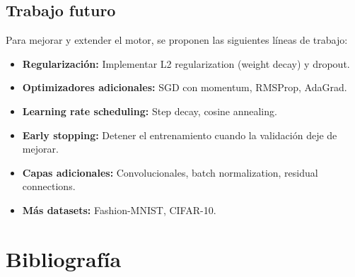 \documentclass[a4paper,11pt]{article}
\begin{document}
\subsection{Trabajo futuro}

Para mejorar y extender el motor, se proponen las siguientes líneas de trabajo:

\begin{itemize}
    \item \textbf{Regularización:} Implementar L2 regularization (weight decay) y dropout.
    
    \item \textbf{Optimizadores adicionales:} SGD con momentum, RMSProp, AdaGrad.
    
    \item \textbf{Learning rate scheduling:} Step decay, cosine annealing.
    
    \item \textbf{Early stopping:} Detener el entrenamiento cuando la validación deje de mejorar.
    
    \item \textbf{Capas adicionales:} Convolucionales, batch normalization, residual connections.
    
    \item \textbf{Más datasets:} Fashion-MNIST, CIFAR-10.
\end{itemize}

\newpage
\section{Bibliografía}
\end{document}
